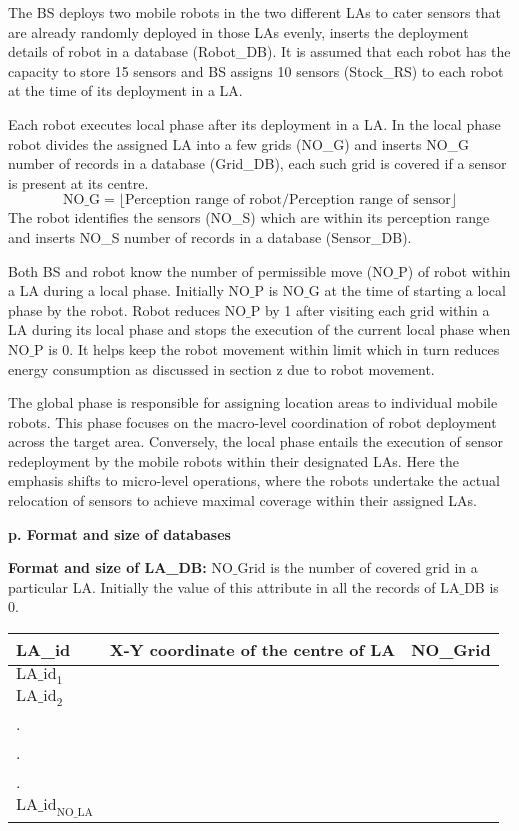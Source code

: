 \documentclass{article}
\begin{document}
The BS deploys two mobile robots in the two different LAs to cater sensors that are already randomly deployed in those LAs evenly, inserts the deployment details of robot in a database (Robot\_DB).
It is assumed that each robot has the capacity to store 15 sensors and BS assigns 10 sensors (Stock\_RS) to each robot at the time of its deployment in a LA.

Each robot executes local phase after its deployment in a LA.
In the local phase robot divides the assigned LA into a few grids (NO\_G) and inserts NO\_G number of records in a database (Grid\_DB), each such grid is covered if a sensor is present at its centre.
\[
\text{NO\_G} = \lfloor \text{Perception range of robot} / \text{Perception range of sensor} \rfloor
\]
The robot identifies the sensors (NO\_S) which are within its perception range and inserts NO\_S number of records in a database (Sensor\_DB).


Both BS and robot know the number of permissible move ($\text{NO\_P}$) of robot within a LA during a local phase. Initially $\text{NO\_P}$ is $\text{NO\_G}$ at the time of starting a local phase by the robot. Robot reduces $\text{NO\_P}$ by 1 after visiting each grid within a LA during its local phase and stops the execution of the current local phase when $\text{NO\_P}$ is 0. It helps keep the robot movement within limit which in turn reduces energy consumption as discussed in section z due to robot movement.

The global phase is responsible for assigning location areas to individual mobile robots. This phase focuses on the macro-level coordination of robot deployment across the target area. Conversely, the local phase entails the execution of sensor redeployment by the mobile robots within their designated LAs. Here the emphasis shifts to micro-level operations, where the robots undertake the actual relocation of sensors to achieve maximal coverage within their assigned LAs.

\noindent\textbf{p. Format and size of databases}

\noindent\textbf{Format and size of LA\_DB:} $\text{NO\_Grid}$ is the number of covered grid in a particular LA. Initially the value of this attribute in all the records of $\text{LA\_DB}$ is 0.

\begin{center}
\begin{tabular}{|l|l|l|}
\hline
LA\_id & X-Y coordinate of the centre of LA & NO\_Grid \\
\hline
$\text{LA\_id}_1$ & & \\
$\text{LA\_id}_2$ & & \\
. & & \\
. & & \\
. & & \\
$\text{LA\_id}_{\text{NO\_LA}}$ & & \\
\hline
\end{tabular}
\end{center}
\end{document}
